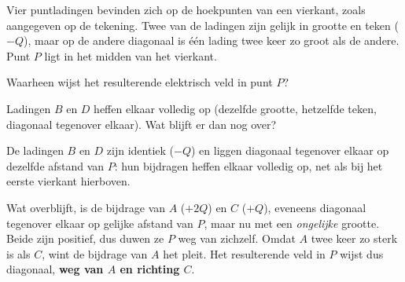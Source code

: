 \documentclass{ximera}
\begin{document}
\begin{question}
    Vier puntladingen bevinden zich op de hoekpunten van een vierkant, zoals aangegeven op de tekening. Twee van de ladingen zijn gelijk in grootte en teken ($-Q$), maar op de andere diagonaal is één lading twee keer zo groot als de andere. Punt $P$ ligt in het midden van het vierkant.

    \begin{center}
    \end{center}

    Waarheen wijst het resulterende elektrisch veld in punt $P$?

    \begin{multipleChoice}
    \end{multipleChoice}

    \begin{hint}
        Ladingen $B$ en $D$ heffen elkaar volledig op (dezelfde grootte, hetzelfde teken, diagonaal tegenover elkaar). Wat blijft er dan nog over?
    \end{hint}

    \begin{solution}\nl
        De ladingen $B$ en $D$ zijn identiek ($-Q$) en liggen diagonaal tegenover elkaar op dezelfde afstand van $P$: hun bijdragen heffen elkaar volledig op, net als bij het eerste vierkant hierboven.

        Wat overblijft, is de bijdrage van $A$ ($+2Q$) en $C$ ($+Q$), eveneens diagonaal tegenover elkaar op gelijke afstand van $P$, maar nu met een \emph{ongelijke} grootte. Beide zijn positief, dus duwen ze $P$ weg van zichzelf. Omdat $A$ twee keer zo sterk is als $C$, wint de bijdrage van $A$ het pleit. Het resulterende veld in $P$ wijst dus diagonaal, \textbf{weg van $A$ en richting $C$}.
    \end{solution}
\end{question}
\end{document}
